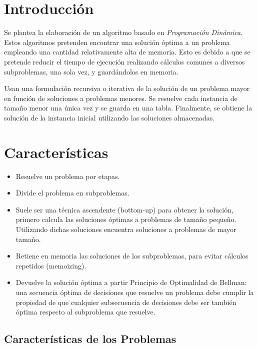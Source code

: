 \documentclass[a4paper,12pt,twoside]{article} %
\begin{document}
\section{Introducción}

Se plantea la elaboración de un algoritmo basado en \textit{Programación Dinámica}. Estos algoritmos pretenden encontrar una solución óptima a un problema empleando una cantidad relativamente alta de memoria. Esto es debido a que se pretende reducir el tiempo de ejecución realizando cálculos comunes a diversos subproblemas, una sola vez, y guardándolos en memoria.

Usan una formulación recursiva o iterativa de la solución de un problema mayor en función de soluciones a problemas menores. Se resuelve cada instancia de tamaño menor una única vez y se guarda en una tabla. Finalmente, se obtiene la solución de la instancia inicial utilizando las soluciones almacenadas.

\section{Características}

\begin{itemize}

    \item Resuelve un problema por etapas.
    \item Divide el problema en subproblemas.
    \item Suele ser una técnica ascendente (bottom-up) para obtener la solución, primero calcula las soluciones óptimas a problemas de tamaño pequeño. Utilizando dichas soluciones encuentra soluciones a problemas de mayor tamaño.
    \item Retiene en memoria las soluciones de los subproblemas, para evitar cálculos repetidos (memoizing).
    \item Devuelve la solución óptima a partir Principio de Optimalidad de Bellman: una secuencia óptima de decisiones que resuelve un problema debe cumplir la propiedad de que cualquier subsecuencia de decisiones debe ser también óptima respecto al subproblema que resuelve.

\end{itemize}
\newpage

\subsection{Características de los Problemas}
\end{document}
